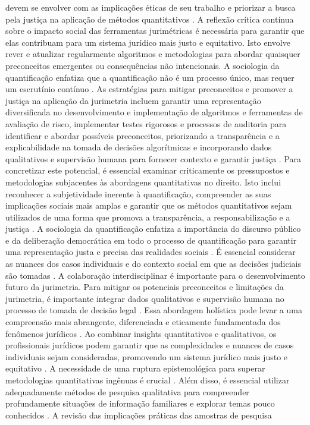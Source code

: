 \begin{agradecimentos}
devem se envolver com as implicações éticas de seu trabalho e priorizar a busca pela justiça na aplicação de métodos quantitativos \cite{10.1007/s11186-021-09453-1,10.3390/fi9040068}. A reflexão crítica contínua sobre o impacto social das ferramentas jurimétricas é necessária para garantir que elas contribuam para um sistema jurídico mais justo e equitativo. Isto envolve rever e atualizar regularmente algoritmos e metodologias para abordar quaisquer preconceitos emergentes ou consequências não intencionais. A sociologia da quantificação enfatiza que a quantificação não é um processo único, mas requer um escrutínio contínuo \cite{10.1590/dados.2022.65.3.267,10.3390/fi9040068}. As estratégias para mitigar preconceitos e promover a justiça na aplicação da jurimetria incluem garantir uma representação diversificada no desenvolvimento e implementação de algoritmos e ferramentas de avaliação de risco, implementar testes rigorosos e processos de auditoria para identificar e abordar possíveis preconceitos, priorizando a transparência e a explicabilidade na tomada de decisões algorítmicas e incorporando dados qualitativos e supervisão humana para fornecer contexto e garantir justiça \cite{10.1007/s11186-021-09453-1,10.3390/fi9040068}. Para concretizar este potencial, é essencial examinar criticamente os pressupostos e metodologias subjacentes às abordagens quantitativas no direito. Isto inclui reconhecer a subjetividade inerente à quantificação, compreender as suas implicações sociais mais amplas e garantir que os métodos quantitativos sejam utilizados de uma forma que promova a transparência, a responsabilização e a justiça \cite{10.1590/dados.2022.65.3.267,10.3390/fi9040068}. A sociologia da quantificação enfatiza a importância do discurso público e da deliberação democrática em todo o processo de quantificação para garantir uma representação justa e precisa das realidades sociais \cite{10.1590/dados.2022.65.3.267,10.3390/fi9040068}. É essencial considerar as nuances dos casos individuais e do contexto social em que as decisões judiciais são tomadas \cite{10.1007/s11186-021-09453-1,10.3390/fi9040068}. A colaboração interdisciplinar é importante para o desenvolvimento futuro da jurimetria. Para mitigar os potenciais preconceitos e limitações da jurimetria, é importante integrar dados qualitativos e supervisão humana no processo de tomada de decisão legal \cite{10.1590/dados.2022.65.3.267,10.1057/s41599-020-00557-0}. Essa abordagem holística pode levar a uma compreensão mais abrangente, diferenciada e eticamente fundamentada dos fenômenos jurídicos \cite{10.1590/dados.2022.65.3.267,10.1057/s41599-020-00557-0}. Ao combinar insights quantitativos e qualitativos, os profissionais jurídicos podem garantir que as complexidades e nuances de casos individuais sejam consideradas, promovendo um sistema jurídico mais justo e equitativo \cite{10.1590/dados.2022.65.3.267,10.1057/s41599-020-00557-0 }. A necessidade de uma ruptura epistemológica para superar metodologias quantitativas ingênuas é crucial \cite{calvo2024}. Além disso, é essencial utilizar adequadamente métodos de pesquisa qualitativa para compreender profundamente situações de informação familiares e explorar temas pouco conhecidos \cite{calvo2024}. A revisão das implicações práticas das amostras de pesquisa 
\end{agradecimentos}
